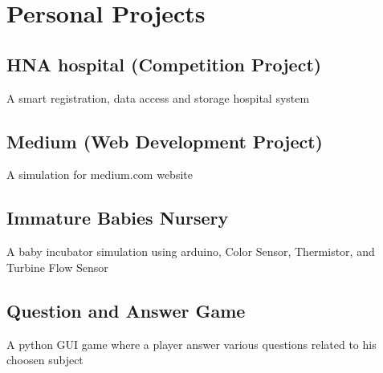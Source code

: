 \documentclass[hidelinks]{article}
\begin{document}
\begin{textblock}{9}
\begin{cvlist}{}
\end{cvlist}

\section*{Personal Projects}
\subsection{HNA hospital (Competition Project)}
A smart registration, data access and storage hospital system 

\subsection{Medium (Web Development Project)}
A simulation for medium.com website

\subsection{Immature Babies Nursery}
A baby incubator simulation using arduino, Color Sensor, Thermistor, and Turbine Flow Sensor

\subsection{Question and Answer Game}
A python GUI game where a player answer various questions related to his choosen subject



\end{textblock}
~\newpage
\end{document}
